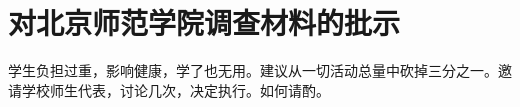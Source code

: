 \section[对北京师范学院调查材料的批示（一九六五年七月三日）]{对北京师范学院调查材料的批示}


学生负担过重，影响健康，学了也无用。建议从一切活动总量中砍掉三分之一。邀请学校师生代表，讨论几次，决定执行。如何请酌。

